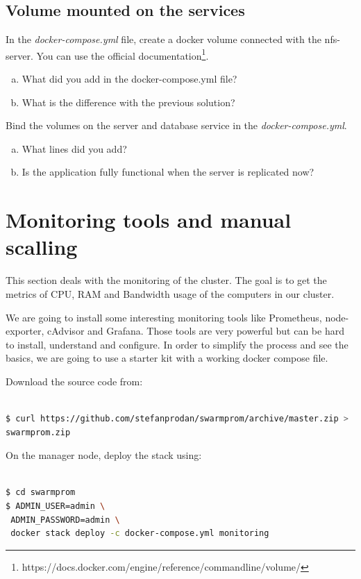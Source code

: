 \documentclass[a4paper,11pt]{exam}
\begin{document}
\subsection{Volume mounted on the services}

\begin{questions}
	\question In the \textit{docker-compose.yml} file, create a docker volume connected with the nfs-server. 
You can use the official documentation\footnote{https://docs.docker.com/engine/reference/commandline/volume/}.
	\begin{enumerate}[(a)]
		\item What did you add in the docker-compose.yml file?
		\item What is the difference with the previous solution?
	\end{enumerate}
	\question Bind the volumes on the server and database service in the \textit{docker-compose.yml}.
	\begin{enumerate}[(a)]
		\item What lines did you add?
		\item Is the application fully functional when the server is replicated now?
	\end{enumerate}
\end{questions}

\clearpage

\section{Monitoring tools and manual scalling}

This section deals with the monitoring of the cluster. The goal is to get the metrics of CPU, RAM and Bandwidth usage of the computers in our cluster.

We are going to install some interesting monitoring tools like Prometheus, node-exporter, cAdvisor and Grafana. 
Those tools are very powerful but can be hard to install, understand and configure.
In order to simplify the process and see the basics, we are going to use a starter kit with a working docker compose file.

Download the source code from:
\begin{lstlisting}[frame=single,language={sh}]  % Start your code-block

$ curl https://github.com/stefanprodan/swarmprom/archive/master.zip >  \
swarmprom.zip
\end{lstlisting}

On the manager node, deploy the stack using: 
\begin{lstlisting}[frame=single,language={sh}]  % Start your code-block

$ cd swarmprom
$ ADMIN_USER=admin \
 ADMIN_PASSWORD=admin \
 docker stack deploy -c docker-compose.yml monitoring
\end{lstlisting}
\end{document}
